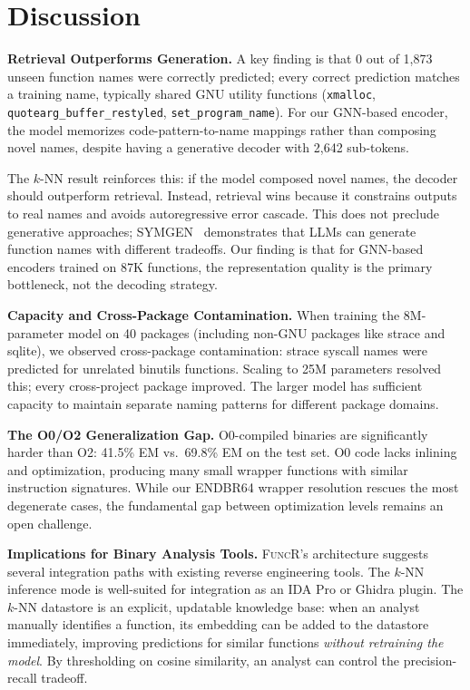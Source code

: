 \documentclass[sigconf,nonacm]{acmart}
\newcommand{\sysname}{\textsc{FuncR}}
\begin{document}
\section{Discussion}
\label{sec:discussion}

\textbf{Retrieval Outperforms Generation.}
A key finding is that 0 out of 1,873 unseen function names were correctly predicted; every correct prediction matches a training name, typically shared GNU utility functions (\texttt{xmalloc}, \texttt{quotearg\_buffer\_\allowbreak{}restyled}, \texttt{set\_program\_name}). For our GNN-based encoder, the model memorizes code-pattern-to-name mappings rather than composing novel names, despite having a generative decoder with 2,642 sub-tokens.

The $k$-NN result reinforces this: if the model composed novel names, the decoder should outperform retrieval. Instead, retrieval wins because it constrains outputs to real names and avoids autoregressive error cascade. This does not preclude generative approaches; SYMGEN~\cite{symgen} demonstrates that LLMs can generate function names with different tradeoffs. Our finding is that for GNN-based encoders trained on 87K functions, the representation quality is the primary bottleneck, not the decoding strategy.

\textbf{Capacity and Cross-Package Contamination.}
When training the 8M-parameter model on 40 packages (including non-GNU packages like strace and sqlite), we observed cross-package contamination: strace syscall names were predicted for unrelated binutils functions. Scaling to 25M parameters resolved this; every cross-project package improved. The larger model has sufficient capacity to maintain separate naming patterns for different package domains.

\textbf{The O0/O2 Generalization Gap.}
O0-compiled binaries are significantly harder than O2: 41.5\% EM vs.\ 69.8\% EM on the test set. O0 code lacks inlining and optimization, producing many small wrapper functions with similar instruction signatures. While our ENDBR64 wrapper resolution rescues the most degenerate cases, the fundamental gap between optimization levels remains an open challenge.

\textbf{Implications for Binary Analysis Tools.}
\sysname{}'s architecture suggests several integration paths with existing reverse engineering tools. The $k$-NN inference mode is well-suited for integration as an IDA Pro or Ghidra plugin. The $k$-NN datastore is an explicit, updatable knowledge base: when an analyst manually identifies a function, its embedding can be added to the datastore immediately, improving predictions for similar functions \emph{without retraining the model}. By thresholding on cosine similarity, an analyst can control the precision-recall tradeoff.
\end{document}
